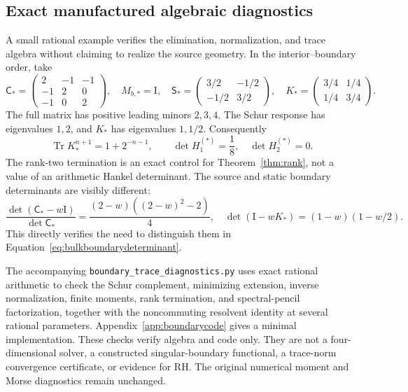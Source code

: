 \documentclass[11pt,letterpaper]{article}
\numberwithin{equation}{section}
\theoremstyle{definition}
\theoremstyle{remark}
\newcommand{\Id}{\mathrm I}
\DeclareMathOperator{\Tr}{Tr}
\begin{document}
\subsection{Exact manufactured algebraic diagnostics}
\label{subsec:exactdiagnostics}
A small rational example verifies the elimination, normalization, and trace algebra without claiming to realize the source geometry. In the interior--boundary order, take
\begin{equation}
 \mathsf C_*=
 \begin{pmatrix}2&-1&-1\\-1&2&0\\-1&0&2\end{pmatrix},
 \quad M_{b,*}=\Id,
 \quad\mathsf S_*=
 \begin{pmatrix}3/2&-1/2\\-1/2&3/2\end{pmatrix},
 \quad K_*=\begin{pmatrix}3/4&1/4\\1/4&3/4\end{pmatrix}.
 \label{eq:rationalexample}
\end{equation}
The full matrix has positive leading minors $2,3,4$. The Schur response has eigenvalues $1,2$, and $K_*$ has eigenvalues $1,1/2$. Consequently
\begin{equation}
 \Tr K_*^{n+1}=1+2^{-n-1},\qquad
 \det H^{(*)}_1=\frac1{8},\quad\det H^{(*)}_2=0.
 \label{eq:rationalmoments}
\end{equation}
The rank-two termination is an exact control for Theorem~\ref{thm:rank}, not a value of an arithmetic Hankel determinant. The source and static boundary determinants are visibly different:
\begin{equation}
 \frac{\det(\mathsf C_*-w\Id)}{\det\mathsf C_*}
 =\frac{(2-w)((2-w)^2-2)}4,
 \quad
 \det(\Id-wK_*)=(1-w)(1-w/2).
 \label{eq:rationaldeterminants}
\end{equation}
This directly verifies the need to distinguish them in Equation~\eqref{eq:bulkboundarydeterminant}.

The accompanying \texttt{boundary\_trace\_diagnostics.py} uses exact rational arithmetic to check the Schur complement, minimizing extension, inverse normalization, finite moments, rank termination, and spectral-pencil factorization, together with the noncommuting resolvent identity at several rational parameters. Appendix~\ref{app:boundarycode} gives a minimal implementation. These checks verify algebra and code only. They are not a four-dimensional solver, a constructed singular-boundary functional, a trace-norm convergence certificate, or evidence for RH. The original numerical moment and Morse diagnostics remain unchanged.
\end{document}
